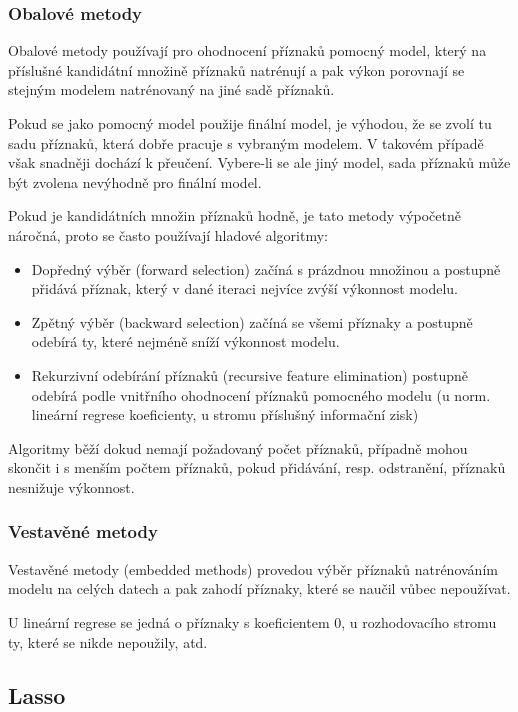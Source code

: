 \documentclass[../main.tex]{subfiles}
\begin{document}
\subsubsection{Obalové metody}

Obalové metody používají pro ohodnocení příznaků pomocný model, který na příslušné kandidátní množině příznaků natrénují a pak výkon porovnají se stejným modelem natrénovaný na jiné sadě příznaků.

Pokud se jako pomocný model použije finální model, je výhodou, že se zvolí tu sadu příznaků, která dobře pracuje s vybraným modelem. V takovém případě však snadněji dochází k přeučení. Vybere-li se ale jiný model, sada příznaků může být zvolena nevýhodně pro finální model.

Pokud je kandidátních množin příznaků hodně, je tato metody výpočetně náročná, proto se často používají hladové algoritmy:
\begin{itemize}

    \item Dopředný výběr (forward selection) začíná s prázdnou množinou a postupně přidává příznak, který v dané iteraci nejvíce zvýší výkonnost modelu.

    \item Zpětný výběr (backward selection) začíná se všemi příznaky a postupně odebírá ty, které nejméně sníží výkonnost modelu.

    \item Rekurzivní odebírání příznaků (recursive feature elimination) postupně odebírá podle vnitřního ohodnocení příznaků pomocného modelu (u norm. lineární regrese koeficienty, u stromu příslušný informační zisk)

\end{itemize}
Algoritmy běží dokud nemají požadovaný počet příznaků, případně mohou skončit i s menším počtem příznaků, pokud přidávání, resp. odstranění, příznaků nesnižuje výkonnost.

\subsubsection{Vestavěné metody}

Vestavěné metody (embedded methods) provedou výběr příznaků natrénováním modelu na celých datech a pak zahodí příznaky, které se naučil vůbec nepoužívat.

U lineární regrese se jedná o příznaky s koeficientem 0, u rozhodovacího stromu ty, které se nikde nepoužily, atd.

\subsection{Lasso} \label{sec:lasso}
\end{document}
